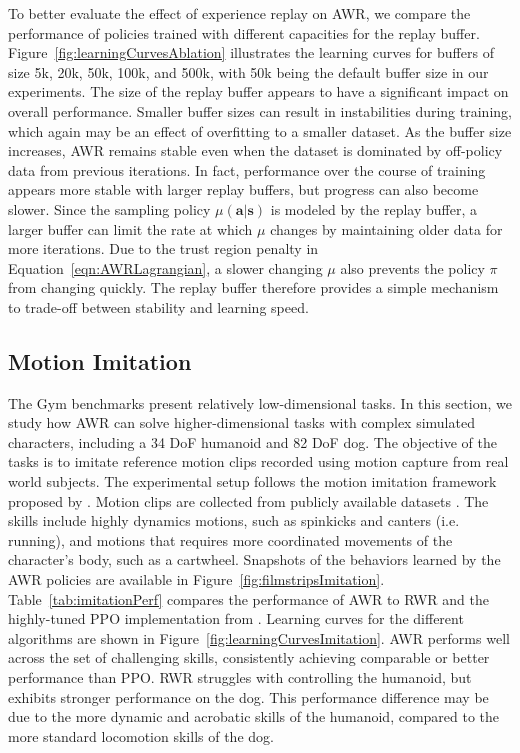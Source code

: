 To better evaluate the effect of experience replay on AWR, we compare the performance of policies trained with different capacities for the replay buffer. Figure~\ref{fig:learningCurvesAblation} illustrates the learning curves for buffers of size 5k, 20k, 50k, 100k, and 500k, with 50k being the default buffer size in our experiments. The size of the replay buffer appears to have a significant impact on overall performance. Smaller buffer sizes can result in instabilities during training, which again may be an effect of overfitting to a smaller dataset. As the buffer size increases, AWR remains stable even when the dataset is dominated by off-policy data from previous iterations. In fact, performance over the course of training appears more stable with larger replay buffers, but progress can also become slower. Since the sampling policy $\mu({\mathbf{a}} | {\mathbf{s}})$ is modeled by the replay buffer, a larger buffer can limit the rate at which $\mu$ changes by maintaining older data for more iterations. Due to the trust region penalty in Equation~\ref{eqn:AWRLagrangian}, a slower changing $\mu$ also prevents the policy $\pi$ from changing quickly. The replay buffer therefore provides a simple mechanism to trade-off between stability and learning speed.

\subsection{Motion Imitation} The Gym benchmarks present relatively low-dimensional tasks. In this section, we study how AWR can solve higher-dimensional tasks with complex simulated characters, including a 34 DoF humanoid and 82 DoF dog. The objective of the tasks is to imitate reference motion clips recorded using motion capture from real world subjects. The experimental setup follows the motion imitation framework proposed by \citet{2018-TOG-deepMimic}. Motion clips are collected from publicly available datasets \citep{CMUMocap,SFUMocap,Zhang2018MNN}. The skills include highly dynamics motions, such as spinkicks and canters (i.e. running), and motions that requires more coordinated movements of the character's body, such as a cartwheel. Snapshots of the behaviors learned by the AWR policies are available in Figure~\ref{fig:filmstripsImitation}. Table~\ref{tab:imitationPerf} compares the performance of AWR to RWR and the highly-tuned PPO implementation from \citet{2018-TOG-deepMimic}. Learning curves for the different algorithms are shown in Figure~\ref{fig:learningCurvesImitation}. AWR performs well across the set of challenging skills, consistently achieving comparable or better performance than PPO. RWR struggles with controlling the humanoid, but exhibits stronger performance on the dog. This performance difference may be due to the more dynamic and acrobatic skills of the humanoid, compared to the more standard locomotion skills of the dog.

